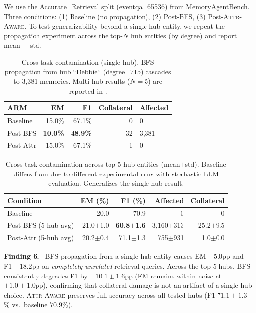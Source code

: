 \documentclass[11pt]{article}
\newcommand{\attraware}{\textsc{Attr-Aware}}
\newcommand{\finding}[1]{\vspace{2pt}\noindent\textbf{Finding #1.}~}
\begin{document}
We use the Accurate\_Retrieval split (eventqa\_65536) from MemoryAgentBench. Three conditions: (1) Baseline (no propagation), (2) Post-BFS, (3) Post-\attraware{}. To test generalizability beyond a single hub entity, we repeat the propagation experiment across the top-$N$ hub entities (by degree) and report mean $\pm$ std.

\begin{table}[htbp]
\centering
\small
\begin{tabular}{lrrrl}
\toprule
\textbf{ARM} & \textbf{EM} & \textbf{F1} & \textbf{Collateral} & \textbf{Affected} \\
\midrule
Baseline     & 15.0\% & 67.1\% & 0  & 0 \\
Post-BFS     & \textbf{10.0\%} & \textbf{48.9\%} & 32 & 3,381 \\
Post-Attr    & 15.0\% & 67.1\% & 1  & 0 \\
\bottomrule
\end{tabular}
\caption{Cross-task contamination (single hub). BFS propagation from hub ``Debbie'' (degree=715) cascades to 3,381 memories. Multi-hub results ($N=5$) are reported in .}
\label{tab:cross_task}
\end{table}

\begin{table}[htbp]
\centering
\small
\begin{tabular}{lrrrr}
\toprule
\textbf{Condition} & \textbf{EM (\%)} & \textbf{F1 (\%)} & \textbf{Affected} & \textbf{Collateral} \\
\midrule
Baseline     & 20.0 & 70.9 & 0 & 0 \\
Post-BFS (5-hub avg)     & 21.0$\pm$1.0 & \textbf{60.8$\pm$1.6} & 3{,}160$\pm$313 & 25.2$\pm$9.5 \\
Post-Attr (5-hub avg)    & 20.2$\pm$0.4 & 71.1$\pm$1.3 & 755$\pm$931 & 1.0$\pm$0.0 \\
\bottomrule
\end{tabular}
\caption{Cross-task contamination across top-5 hub entities (mean$\pm$std). Baseline differs from  due to different experimental runs with stochastic LLM evaluation. Generalizes the single-hub result.}
\label{tab:cross_task_multi}
\end{table}

\finding{6} BFS propagation from a single hub entity causes EM $-5.0$pp and F1 $-18.2$pp on \textit{completely unrelated} retrieval queries. Across the top-5 hubs, BFS consistently degrades F1 by $-10.1\pm1.6$pp (EM remains within noise at $+1.0\pm1.0$pp), confirming that collateral damage is not an artifact of a single hub choice. \attraware{} preserves full accuracy across all tested hubs (F1 $71.1\pm1.3$\% vs.\ baseline $70.9$\%).
\end{document}

